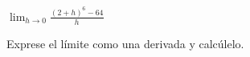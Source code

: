 \item $\displaystyle \lim_{h \to 0} \frac{(2 + h)^6 - 64}{h}$
\par
Exprese el límite como una derivada y calcúlelo.
